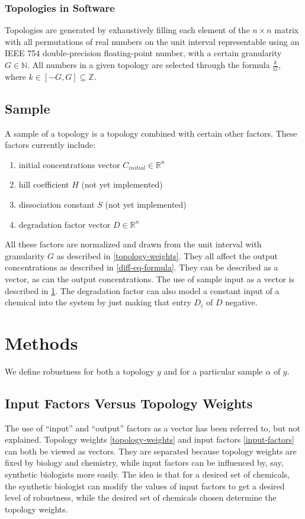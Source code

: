 \documentclass{article}
\begin{document}
\subsubsection{Topologies in Software}
Topologies are generated by exhaustively filling each element of the $n \times n$ matrix with all permutations of real numbers on the unit interval representable using an IEEE 754 double-precision floating-point number, with a certain granularity $G \in \mathbb{N}$. All numbers in a given topology are selected through the formula $\frac{k}{G}$, where $k \in [-G,G] \subseteq \mathbb{Z}$.

\subsection{Sample}
A sample of a topology is a topology combined with certain other factors. These factors currently include:

\begin{enumerate} \label{input-factors}
\item initial concentrations vector $C_{initial} \in \mathbb{R}^n$
\item hill coefficient $H$ (not yet implemented) \cite{igem-hill-coefficients}
\item dissociation constant $S$ (not yet implemented) \cite{igem-hill-coefficients}
\item degradation factor vector $D \in \mathbb{R}^n$
\end{enumerate}

All these factors are normalized and drawn from the unit interval with granularity $G$ as described in \ref{topology-weights}. They all affect the output concentrations as described in \eqref{diff-eq-formula}. They can be described as a vector, as can the output concentrations. The use of sample input as a vector is described in \ref{statistic-analysis}. The degradation factor can also model a constant input of a chemical into the system by just making that entry $D_i$ of $D$ negative.

\section{Methods} \label{statistic-analysis}
We define robustness for both a topology $y$ and for a particular sample $\alpha$ of $y$.

\subsection{Input Factors Versus Topology Weights}
The use of ``input'' and ``output'' factors as a vector has been referred to, but not explained. Topology weights \ref{topology-weights} and input factors \ref{input-factors} can both be viewed as vectors. They are separated because topology weights are fixed by biology and chemistry, while input factors can be influenced by, say, synthetic biologists more easily. The idea is that for a desired set of chemicals, the synthetic biologist can modify the values of input factors to get a desired level of robustness, while the desired set of chemicals chosen determine the topology weights.
\end{document}
